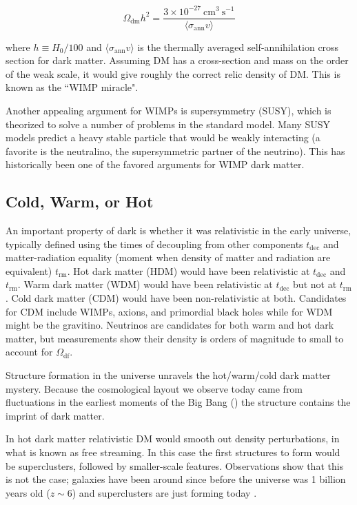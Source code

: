 \begin{equation}
\Omega_{\mathrm{dm}}h^{2} = \frac{3 \times 10^{-27}\ \mathrm{cm^{3}\ s^{-1}}}{\langle \sigma_{\mathrm{ann}} v \rangle}
\end{equation}

\noindent where $h \equiv H_0 / 100$ and $\langle \sigma_{\mathrm{ann}} v \rangle$ is
the thermally averaged self-annihilation cross section
for dark matter.  Assuming DM has a cross-section and mass on the order of the weak scale,
it would give roughly the correct relic density of DM.  This is known as the ``WIMP miracle".

Another appealing argument for WIMPs is supersymmetry (SUSY), which is theorized to solve a number of problems
in the standard model.  Many SUSY models predict a heavy stable particle that would be weakly interacting (a favorite is the neutralino,
the supersymmetric partner of the neutrino).  This has historically been one of the favored arguments for WIMP dark matter.

\subsection{Cold, Warm, or Hot} \label{subsec:hot_vs_cold}
An important property of dark is whether it was relativistic in the early universe, typically defined using the times of decoupling from
other components $t_{\mathrm{dec}}$ and matter-radiation equality (moment when density of matter and radiation are equivalent)
$t_{\mathrm{rm}}$.  Hot dark matter (HDM) would have been relativistic at $t_{\mathrm{dec}}$ and $t_{\mathrm{rm}}$.  Warm dark matter
(WDM) would have been relativistic at $t_{\mathrm{dec}}$
but not at $t_{\mathrm{rm}}$.  Cold dark matter (CDM) would have been non-relativistic at both.  Candidates for CDM include
WIMPs, axions, and primordial black holes while for WDM might be the gravitino.  Neutrinos are candidates for both
warm and hot dark matter, but measurements show their density is orders of magnitude to small to account for $\Omega_{\mathrm{df}}$.

Structure formation in the universe unravels the hot/warm/cold dark matter mystery.  Because the cosmological layout we observe
today came from fluctuations in the earliest moments of the Big Bang () the structure
contains the imprint of dark matter.

In hot dark matter relativistic DM would smooth out density perturbations, in what is known as free
streaming.  In this case the first structures to form would be superclusters, followed by smaller-scale
features.  Observations show that this is not the case; galaxies have been around since before the universe
was 1 billion years old ($z \sim 6$) and superclusters are just forming today .

